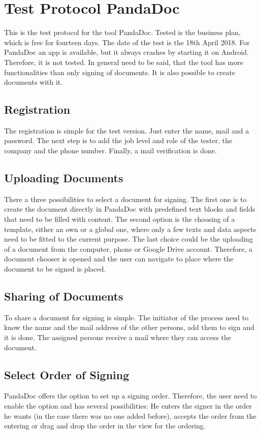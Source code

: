 \section{Test Protocol PandaDoc}
\label{tool:sec:pandadoc}

This is the test protocol for the tool PandaDoc. Tested is the business plan, which is free for fourteen days. The date of the test is the 18th April 2018. For PandaDoc an \gls{app} is available, but it always crashes by starting it on Android. Therefore, it is not tested. In general need to be said, that the tool has more functionalities than only signing of documents. It is also possible to create documents with it.

\subsection{Registration}
The registration is simple for the test version. Just enter the name, mail and a password. The next step is to add the job level and role of the tester, the company and the phone number. Finally, a mail verification is done.

\subsection{Uploading Documents}
There a three possibilities to select a document for signing. The first one is to create the document directly in PandaDoc with predefined text blocks and fields that need to be filled with content. The second option is the choosing of a template, either an own or a global one, where only a few texts and data aspects need to be fitted to the current purpose. The last choice could be the uploading of a document from the computer, phone or Google Drive account. Therefore, a document chooser is opened and the user can navigate to place where the document to be signed is placed.

\subsection{Sharing of Documents}
To share a document for signing is simple. The initiator of the process need to know the name and the mail address of the other persons, add them to sign and it is done. The assigned persons receive a mail where they can access the document.

\subsection{Select Order of Signing}
PandaDoc offers the option to set up a signing order. Therefore, the user need to enable the option and has several possibilities: He enters the signer in the order he wants (in the case there was no one added before), accepts the order from the entering or drag and drop the order in the view for the ordering.

